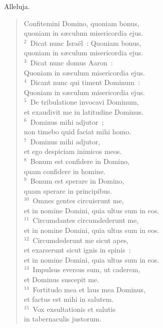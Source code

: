 \bchapter
\lettrine[lines=3,image=true,loversize=0.05,lraise=-0.03]{A}{}lleluja. \begin{flushleft}\begin{verse}\vspace{6pt}Confitemini Domino, quoniam bonus,\\ quoniam in s\ae culum misericordia ejus.\\
${}^{2}$~Dicat nunc Isra\"el~: Quoniam bonus,\\ quoniam in s\ae culum misericordia ejus.\\
${}^{3}$~Dicat nunc domus Aaron~:\\ Quoniam in s\ae culum misericordia ejus.\\
${}^{4}$~Dicant nunc qui timent Dominum~:\\ Quoniam in s\ae culum misericordia ejus.\\
${}^{5}$~De tribulatione invocavi Dominum,\\ et exaudivit me in latitudine Dominus.\\
${}^{6}$~Dominus mihi adjutor~;\\ non timebo quid faciat mihi homo.\\
${}^{7}$~Dominus mihi adjutor,\\ et ego despiciam inimicos meos.\\
${}^{8}$~Bonum est confidere in Domino,\\ quam confidere in homine.\\
${}^{9}$~Bonum est sperare in Domino,\\ quam sperare in principibus.\\
${}^{10}$~Omnes gentes circuierunt me,\\ et in nomine Domini, quia ultus sum in eos.\\
${}^{11}$~Circumdantes circumdederunt me,\\ et in nomine Domini, quia ultus sum in eos.\\
${}^{12}$~Circumdederunt me sicut apes,\\ et exarserunt sicut ignis in spinis~:\\ et in nomine Domini, quia ultus sum in eos.\\
${}^{13}$~Impulsus eversus sum, ut caderem,\\ et Dominus suscepit me.\\
${}^{14}$~Fortitudo mea et laus mea Dominus,\\ et factus est mihi in salutem.\\
${}^{15}$~Vox exsultationis et salutis\\ in tabernaculis justorum.\\

\end{verse}
\end{flushleft}
